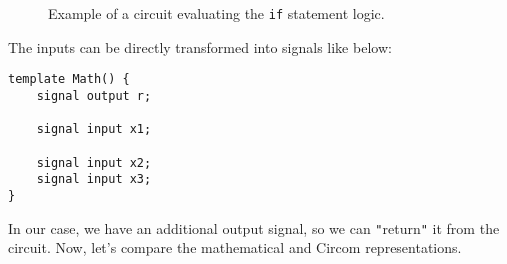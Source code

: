 \documentclass[../lecture-notes-148x210.tex]{subfiles}
\begin{document}
\begin{figure}[h!]
{
    }
    \caption{Example of a circuit evaluating the \texttt{if} statement logic.}
    \label{fig:polynomial-circuit}
\end{figure}

The inputs can be directly transformed into signals like below:
\begin{lstlisting}[language=Circom]
template Math() {
    signal output r;

    signal input x1;

    signal input x2;
    signal input x3;
}
\end{lstlisting}

In our case, we have an additional output signal, so we can \texttt{"}return\texttt{"} it from the circuit.
Now, let's compare the mathematical and Circom representations.
\end{document}
